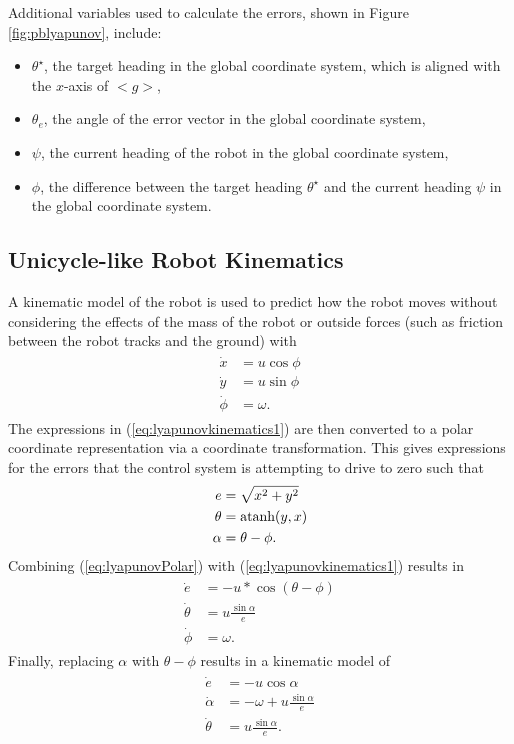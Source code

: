 Additional variables used to calculate the errors, shown in Figure \ref{fig:pblyapunov}, include:
\begin{itemize}
\item $\theta^\star$, the target heading in the global coordinate system, which is aligned with the $x$-axis of $<g>$,
\item $\theta_e$, the angle of the error vector in the global coordinate system,
\item $\psi$, the current heading of the robot in the global coordinate system,
\item $\phi$, the difference between the target heading $\theta^\star$ and the current heading $\psi$ in the global coordinate system.
\end{itemize}

\subsection{Unicycle-like Robot Kinematics}
\label{sec:unicycleKinematics}
A kinematic model of the robot is used to predict how the robot moves without considering the effects of the mass of the robot or outside forces (such as friction between the robot tracks and the ground) with
\begin{align}
\label{eq:lyapunovkinematics1}
\begin{split}
\dot{x} &= u\cos\phi \\
\dot{y} &= u\sin\phi \\
\dot{\phi} &= \omega.
\end{split}
\end{align}
The expressions in (\ref{eq:lyapunovkinematics1}) are then converted to a polar coordinate representation via a coordinate transformation. This gives expressions for the errors that the control system is attempting to drive to zero such that
\begin{align}
\label{eq:lyapunovPolar}
\begin{split}
e &= \sqrt{x^2+y^2} \\
\theta &= \mathop{\text{atanh}}(y,x) \\
\alpha &= \theta - \phi.
\end{split}
\end{align}
Combining (\ref{eq:lyapunovPolar}) with (\ref{eq:lyapunovkinematics1}) results in
\begin{align*}
\begin{split}
\dot{e} &= -u*\cos(\theta-\phi) \\
\dot{\theta} &= u\frac{\sin\alpha}{e} \\
\dot{\phi} &= \omega.
\end{split}
\end{align*}
Finally, replacing $\alpha$ with $\theta-\phi$ results in a kinematic model of
\begin{align}
\label{eq:lyapunovkinematics}
\begin{split}
\dot{e} &= -u\cos\alpha \\
\dot{\alpha} &= -\omega + u\frac{\sin\alpha}{e} \\
\dot{\theta} &= u\frac{\sin\alpha}{e}.
\end{split}
\end{align}

